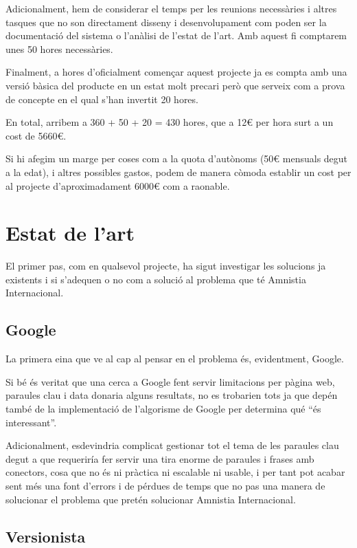 \documentclass{article}
\begin{document}
Adicionalment, hem de considerar el temps per les reunions necessàries i altres tasques que no son directament disseny i desenvolupament com poden ser la documentació del sistema o l'anàlisi de l'estat de l'art. Amb aquest fi comptarem unes 50 hores necessàries.

Finalment, a hores d'oficialment començar aquest projecte ja es compta amb una versió bàsica del producte en un estat molt precari però que serveix com a prova de concepte en el qual s'han invertit 20 hores.

En total, arribem a 360 + 50 + 20 = 430 hores, que a 12€ per hora surt a un cost de 5660€.

Si hi afegim un marge per coses com a la quota d'autònoms (50€ mensuals degut a la edat), i altres possibles gastos, podem de manera còmoda establir un cost per al projecte d'aproximadament 6000€ com a raonable.

\newpage

\section{Estat de l'art}

El primer pas, com en qualsevol projecte, ha sigut investigar les solucions ja existents i si s'adequen o no com a solució al problema que té Amnistia Internacional.

\subsection{Google}

La primera eina que ve al cap al pensar en el problema és, evidentment, Google.

Si bé és veritat que una cerca a Google fent servir limitacions per pàgina web, paraules clau i data donaria alguns resultats, no es trobarien tots ja que depén també de la implementació de l'algorisme de Google per determina qué ``és interessant''.

Adicionalment, esdevindria complicat gestionar tot el tema de les paraules clau degut a que requeriría fer servir una tira enorme de paraules i frases amb conectors, cosa que no és ni pràctica ni escalable ni usable, i per tant pot acabar sent més una font d'errors i de pérdues de temps que no pas una manera de solucionar el problema que pretén solucionar Amnistia Internacional.

\subsection{Versionista}
\end{document}
